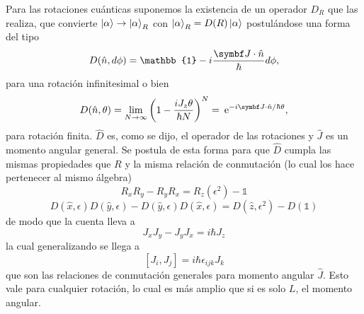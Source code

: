 \documentclass[10pt,oneside]{CBFT_book}
\begin{document}
Para las rotaciones cuánticas suponemos la existencia de un operador $D_R$ que las realiza, que
convierte $ \Ket{\alpha} \to \Ket{\alpha}_R $ con $ \Ket{\alpha}_R = D(R) \Ket{\alpha} $ postulándose una forma del
tipo 
\[
	D(\hat{n},d\phi) = \mathbb{1} - i \frac{\vb{J}\cdot\hat{n}}{\hbar}d\phi,
\]
para una rotación infinitesimal o bien
\[
	D(\hat{n},\theta) = \lim_{N\to\infty} \left( 1 - \frac{i J_z \theta}{\hbar N} \right)^N =
	\euler^{-i \vb{J}\cdot\hat{n}/\hbar \theta},
\]
para rotación finita. 
$\hat{D}$ es, como se dijo, el operador de las rotaciones y $\hat{J}$ es un momento angular 
general. Se postula de esta forma para que $\hat{D}$ cumpla las mismas propiedades que $R$ y la 
misma relación de conmutación (lo cual los hace pertenecer al mismo álgebra)
\[
	R_x R_y - R_y R_x = R_z (\epsilon^2) - \mathbb{1}
\]
\[
	D(\hat{x},\epsilon) D(\hat{y},\epsilon) - D(\hat{y},\epsilon) D(\hat{x},\epsilon) =
	D(\hat{z},\epsilon^2) - D(\mathbb{1})
\]
de modo que la cuenta lleva a  
\[
	J_x J_y - J_y J_x = i \hbar J_z
\]
la cual generalizando se llega a 
\[
	[J_i,J_j] = i \hbar \epsilon_{ijk} J_k
\]
que son las relaciones de conmutación generales para momento angular $\hat{J}$.
Esto vale para cualquier rotación, lo cual es más amplio que si es solo $L$, el momento angular.
\end{document}
